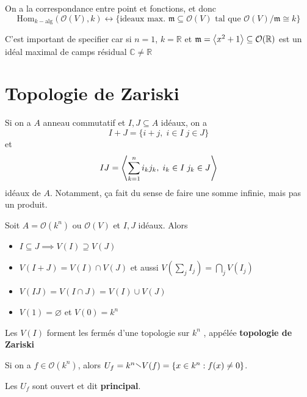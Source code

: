 \begin{remark}{}
    On a la correspondance entre point et fonctions, et donc
    \[
      \mathrm{Hom}_{k-\text{alg}} {(\mathcal{O}{(V)}, k)} \leftrightarrow
      \{\text{ideaux max. }\mathfrak{m} \subseteq \mathcal{O}{(V)} \text{ tal que }
      \mathcal{O}{(V)} / \mathfrak{m} \cong k\}
    \]
\end{remark}

\begin{example}{}
    C'est important de specifier car si \(n = 1\), \(k = \mathbb{R}\) et
    \(\mathfrak{m} = {\left\langle x^2 + 1\right\rangle} \subseteq \mathcal{O}{(\mathbb{R})} \) est
    un idéal maximal de camps résidual \(\mathbb{C} \neq \mathbb{R}\) 
\end{example}

\section{Topologie de Zariski}

Si on a \(A\) anneau commutatif et \(I, J \subseteq A \) idéaux, on a
\[
  I + J = \{ i + j, \; i \in I \; j \in J\} 
\]
et 
\[
  IJ = {\left\langle\sum_{k=1}^{n} i_k j_k, \; i_k \in I \; j_k \in J \right\rangle} 
\]
idéaux de \(A\). Notamment, ça fait du sense de faire une somme infinie, mais
pas un produit. 

\begin{lemma}{}
    Soit \(A = \mathcal{O}{(k^{n})} \text{ ou } \mathcal{O}{(V)}\) et \(I, J\)
    idéaux. Alors

\begin{itemize}
    \item \(I \subseteq J \implies  V{(I)} \supseteq V{(J)}  \) 
    \item \(V{(I + J)} = V{(I)} \cap V{(J)}\) et aussi \(V{\left( \sum_{j} I_j \right)} = \bigcap_{j} V{(I_j)}\) 
    \item \(V{(IJ)} = V{(I \cap J)} = V{(I)} \cup V{(J)}\) 
    \item \(V{(1)} = \varnothing\) et \(V{(0)} = k^{n}\) 
\end{itemize}
\end{lemma}

\begin{corollary}{}
    Les \(V{(I)}\) forment les fermés d'une topologie sur \(k^{n}\) , appélée
    \textbf{topologie de Zariski}
\end{corollary}


\begin{definition}{}
    Si on a \(f \in \mathcal{O}{(k^{n})}\), alors \(U_f = k^{n} \sminus V{(f)} =
    \{x \in k^{n} : f{(x)} \neq 0\} \).

    Les \(U_f\) sont ouvert et dit \textbf{principal}.
\end{definition}

